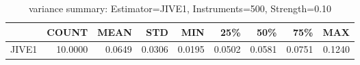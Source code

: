 \begin{table}[ht]
\centering
\caption{variance summary: Estimator=JIVE1, Instruments=500, Strength=0.10}
\begin{tabular}{lrrrrrrrr}
\toprule
 & COUNT & MEAN & STD & MIN & 25\% & 50\% & 75\% & MAX \\
\midrule
JIVE1 & 10.0000 & 0.0649 & 0.0306 & 0.0195 & 0.0502 & 0.0581 & 0.0751 & 0.1240 \\
\bottomrule
\end{tabular}
\end{table}

